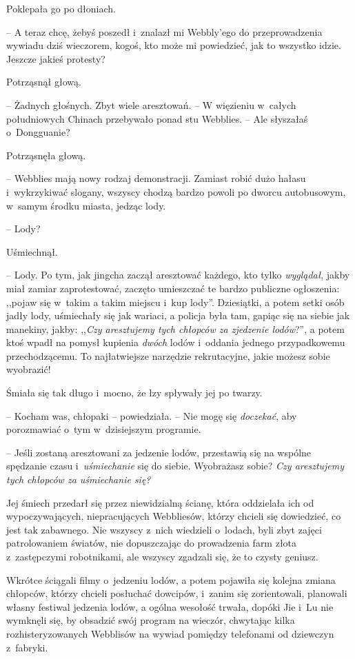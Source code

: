 \documentclass[oneside,polish,11pt,rmheadings]{mwbk}
\begin{document}
Poklepała go po dłoniach. 

-- A teraz chcę, żebyś poszedł i~znalazł mi Webbly'ego do przeprowadzenia wywiadu dziś wieczorem, kogoś, kto może mi powiedzieć, jak to wszystko idzie. Jeszcze jakieś protesty?

Potrząsnął głową. 

-- Żadnych głośnych. Zbyt wiele aresztowań. -- W więzieniu w~całych południowych Chinach przebywało ponad stu Webblies. -- Ale słyszałaś o~Dongguanie?

Potrząsnęła głową.

-- Webblies mają nowy rodzaj demonstracji. Zamiast robić dużo hałasu i~wykrzykiwać slogany, wszyscy chodzą bardzo powoli po dworcu autobusowym, w~samym środku miasta, jedząc lody.

-- Lody? 

Uśmiechnął. 

-- Lody. Po tym, jak jingcha zaczął aresztować każdego, kto tylko \textit{wyglądał}, jakby miał zamiar zaprotestować, zaczęto umieszczać te bardzo publiczne ogłoszenia: ,,pojaw się w~takim a takim miejscu i~kup lody''. Dziesiątki, a potem setki osób jadły lody, uśmiechały się jak wariaci, a policja była tam, gapiąc się na siebie jak manekiny, jakby: ,,\textit{Czy aresztujemy tych chłopców za zjedzenie lodów}?'', a potem ktoś wpadł na pomysł kupienia \textit{dwóch }lodów i~oddania jednego przypadkowemu przechodzącemu. To najłatwiejsze narzędzie rekrutacyjne, jakie możesz sobie wyobrazić! 

Śmiała się tak długo i~mocno, że łzy spływały jej po twarzy. 

-- Kocham was, chłopaki -- powiedziała. -- Nie mogę się \textit{doczekać}, aby porozmawiać o~tym w~dzisiejszym programie.

-- Jeśli zostaną aresztowani za jedzenie lodów, przestawią się na wspólne spędzanie czasu i~\textit{uśmiechanie }się do siebie. Wyobrażasz sobie? \textit{Czy aresztujemy tych chłopców za uśmiechanie się?}

Jej śmiech przedarł się przez niewidzialną ścianę, która oddzielała ich od wypoczywających, niepracujących Webbliesów, którzy chcieli się dowiedzieć, co jest tak zabawnego. Nie wszyscy z~nich wiedzieli o~lodach, byli zbyt zajęci patrolowaniem światów, nie dopuszczając do prowadzenia farm złota z~zastępczymi robotnikami, ale wszyscy zgadzali się, że to czysty geniusz.

Wkrótce ściągali filmy o~jedzeniu lodów, a potem pojawiła się kolejna zmiana chłopców, którzy chcieli posłuchać dowcipów, i~zanim się zorientowali, planowali własny festiwal jedzenia lodów, a ogólna wesołość trwała, dopóki Jie i~Lu nie wymknęli się, by obsadzić swój program na wieczór, chwytając kilka rozhisteryzowanych Webblisów na wywiad pomiędzy telefonami od dziewczyn z~fabryki.
\end{document}
